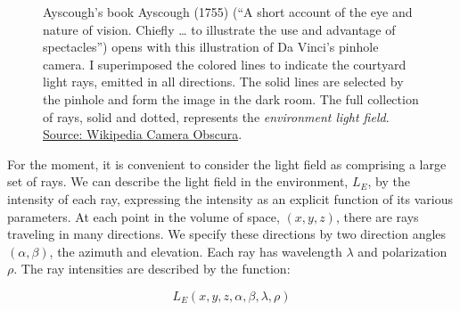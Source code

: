 \documentclass[
  letterpaper,
]{book}
\begin{document}
\begin{figure}


\caption{\label{fig-ayscough}Ayscough's book Ayscough (1755) (``A short
account of the eye and nature of vision. Chiefly \ldots{} to illustrate
the use and advantage of spectacles'') opens with this illustration of
Da Vinci's pinhole camera. I superimposed the colored lines to indicate
the courtyard light rays, emitted in all directions. The solid lines are
selected by the pinhole and form the image in the dark room. The full
collection of rays, solid and dotted, represents the \emph{environment
light field}.
\href{https://en.wikipedia.org/wiki/Camera_obscura\#/media/File:1755_james_ayscough.jpg}{Source:
Wikipedia Camera Obscura}.}

\end{figure}%

For the moment, it is convenient to consider the light field as
comprising a large set of rays. We can describe the light field in the
environment, \(L_E\), by the intensity of each ray, expressing the
intensity as an explicit function of its various parameters. At each
point in the volume of space, \((x,y,z)\), there are rays traveling in
many directions. We specify these directions by two direction angles
\((\alpha,\beta)\), the azimuth and elevation. Each ray has wavelength
\(\lambda\) and polarization \(\rho\). The ray intensities are described
by the function:

\[
L_E(x,y,z,\alpha,\beta,\lambda,\rho)
\]
\end{document}
